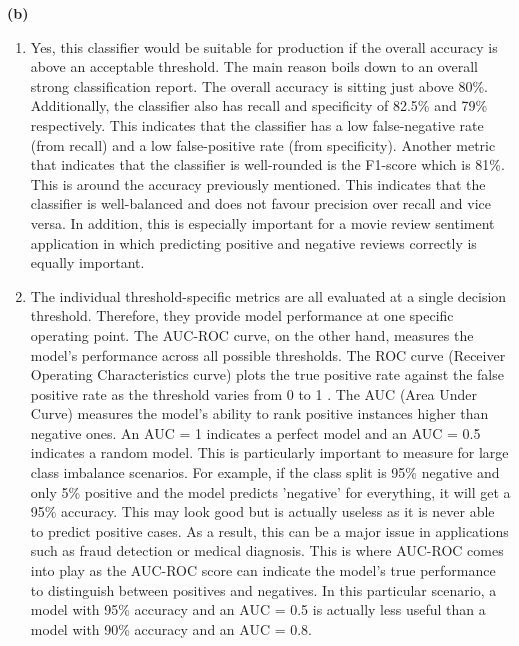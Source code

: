 \noindent\textbf{(b)}
\begin{enumerate}[label=\roman*., topsep=0pt, itemsep=2pt]
    \item Yes, this classifier would be suitable for production if the overall accuracy is above an acceptable threshold. The main reason boils down to an overall strong classification
          report. The overall accuracy is sitting just above 80\%. Additionally, the classifier also has recall and specificity of 82.5\% and 79\% respectively. This indicates that the classifier
          has a low false-negative rate (from recall) and a low false-positive rate (from specificity). Another metric that indicates that the classifier is well-rounded is the F1-score
          which is 81\%. This is around the accuracy previously mentioned. This indicates that the classifier is well-balanced and does not favour precision over recall and vice versa. In
          addition, this is especially important for a movie review sentiment application in which predicting positive and negative reviews correctly is equally important.
    \newpage
    \item The individual threshold-specific metrics are all evaluated at a single decision threshold. Therefore, they provide model performance at one specific operating point. The AUC-ROC 
          curve, on the other hand, measures the model's performance across all possible thresholds. The ROC curve (Receiver Operating Characteristics curve) plots the true positive rate
          against the false positive rate as the threshold varies from 0 to 1 \parencite{geron2019hands}. The AUC (Area Under Curve) measures the model's ability to rank positive instances higher than negative ones.
          An AUC = 1 indicates a perfect model and an AUC = 0.5 indicates a random model. This is particularly important to measure for large class imbalance scenarios. For example,
          if the class split is 95\% negative and only 5\% positive and the model predicts 'negative' for everything, it will get a 95\% accuracy. This may look good but is actually 
          useless as it is never able to predict positive cases. As a result, this can be a major issue in applications such as fraud detection or medical diagnosis. This is where AUC-ROC comes 
          into play as the AUC-ROC score can indicate the model's true performance to distinguish between positives and negatives. In this particular scenario, a model with 95\% accuracy 
          and an AUC = 0.5 is actually less useful than a model with 90\% accuracy and an AUC = 0.8.
\end{enumerate}



